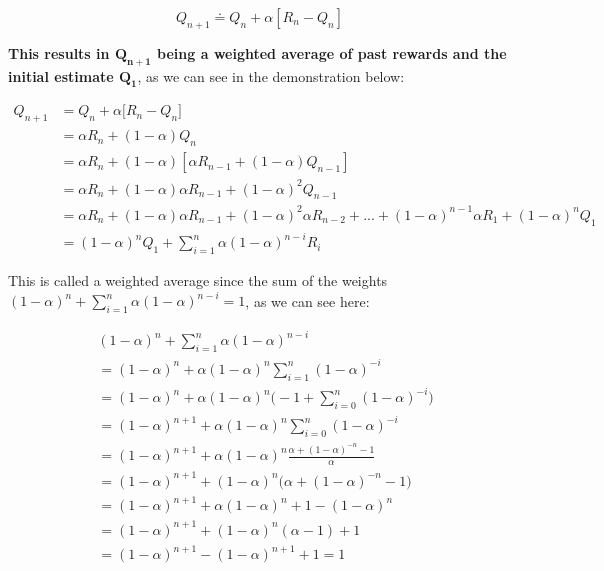 \begin{equation}
    Q_{n+1} \doteq Q_n + \alpha \left[R_n - Q_n \right]
    \label{eq:ch3-nonstationaryincrementalupdaterule}
\end{equation}

\textbf{This results in $\boldsymbol{Q_{n+1}}$ being a weighted average of past rewards and the initial estimate $\boldsymbol{Q_1}$}, as we can see in the demonstration below:

\begin{equation}
    \begin{split}
        Q_{n+1} &= Q_n + \alpha \Big[ R_n - Q_n \Big] \\
        &= \alpha R_n + (1 - \alpha) Q_n \\
        &= \alpha R_n + (1 - \alpha) [\alpha R_{n-1} + (1 - \alpha) Q_{n-1}] \\
        &= \alpha R_n + (1 - \alpha) \alpha R_{n-1} + (1 - \alpha)^2 Q_{n-1} \\
        &= \alpha R_n + (1 - \alpha) \alpha R_{n-1} + (1 - \alpha)^2 \alpha R_{n-2} + ... + (1 - \alpha)^{n-1} \alpha R_1 + (1 - \alpha)^n Q_1 \\
        &= (1 - \alpha)^n Q_1 + \sum_{i=1}^{n} \alpha (1 - \alpha)^{n-i} R_i
    \end{split}
    \label{eq:ch3-exponentialrecencyweightedaverage}
\end{equation}

This is called a weighted average since the sum of the weights $(1 - \alpha)^n + \sum_{i=1}^{n} \alpha (1 - \alpha)^{n-i} = 1$, as we can see here:

\begin{equation*}
    \begin{split}
        & (1 - \alpha)^n + \sum_{i=1}^{n} \alpha (1 - \alpha)^{n-i} \\
        &= (1 - \alpha)^n + \alpha (1 - \alpha)^n \sum_{i=1}^{n} (1 - \alpha)^{-i} \\
        &= (1 - \alpha)^n + \alpha (1 - \alpha)^n \Big(-1 + \sum_{i=0}^{n} (1 - \alpha)^{-i} \Big) \\
        &= (1 - \alpha)^{n+1} + \alpha (1 - \alpha)^n \sum_{i=0}^{n} (1 - \alpha)^{-i} \\
        &= (1 - \alpha)^{n+1} + \alpha (1 - \alpha)^n \frac{\alpha + (1 - \alpha)^{-n} -1}{\alpha} \\
        &= (1 - \alpha)^{n+1} + (1 - \alpha)^n \Big( \alpha + (1 - \alpha)^{-n} -1 \Big) \\
        &= (1 - \alpha)^{n+1} + \alpha (1 - \alpha)^n + 1 - (1 - \alpha)^n \\
        &= (1 - \alpha)^{n+1} + (1 - \alpha)^n (\alpha - 1) + 1 \\
        &= (1 - \alpha)^{n+1} - (1 - \alpha)^{n+1} + 1 = 1
    \end{split}
\end{equation*}

